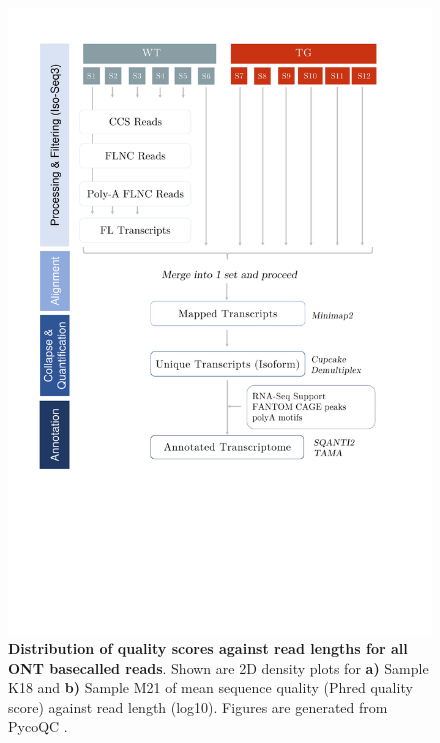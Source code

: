 \begin{figure}[htp]
	\begin{center}
		\includegraphics[page=4,trim={0 16cm 0cm 0},clip, scale = 0.45]{Figures/Pipeline.pdf}
	\end{center}
	\captionsetup{width=0.95\textwidth}
	\caption[ONT read quality against read length from Whole Transcriptome Sequencing ]%
	{\textbf{Distribution of quality scores against read lengths for all ONT basecalled reads}. Shown are 2D density plots for \textbf{a)} Sample K18 and \textbf{b)} Sample M21 of mean sequence quality (Phred quality score) against read length (log10). Figures are generated from PycoQC \cite{Leger2019}.}
	\label{fig:ont_lengthvsquality}
\end{figure}

\clearpage
